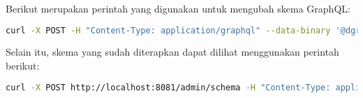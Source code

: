 Berikut merupakan perintah yang digunakan untuk mengubah skema GraphQL:

\begin{lstlisting}[language=bash]
    curl -X POST -H "Content-Type: application/graphql" --data-binary '@dgraph/simple.graphql' http://localhost:8081/admin/schema
\end{lstlisting}

Selain itu, skema yang sudah diterapkan dapat dilihat menggunakan perintah berikut:

\begin{lstlisting}[language=bash]
    curl -X POST http://localhost:8081/admin/schema -H "Content-Type: application/json" -d '{"query": "{ getGQLSchema { schema } }"}'
\end{lstlisting}
